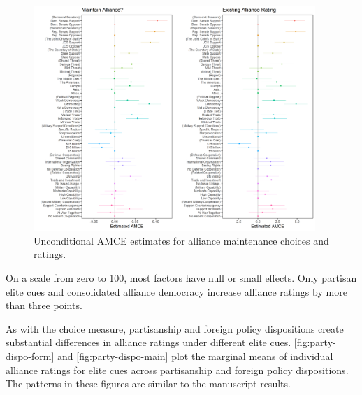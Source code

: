 \documentclass[12pt]{article}
\begin{document}
\begin{figure}[htpb]
	\centering
		\includegraphics[width=0.95\textwidth]{maintenance-plots.png}
	\caption{Unconditional AMCE estimates for alliance maintenance choices and ratings.}
	\label{fig:maintenance-plots}
\end{figure}

%

On a scale from zero to 100, most factors have null or small effects. 
Only partisan elite cues and consolidated alliance democracy increase alliance ratings by more than three points. 


As with the choice measure, partisanship and foreign policy dispositions create substantial differences in alliance ratings under different elite cues.
\autoref{fig:party-dispo-form} and \autoref{fig:party-dispo-main} plot the marginal means of individual alliance ratings for elite cues across partisanship and foreign policy dispositions. 
The patterns in these figures are similar to the manuscript results.  
\end{document}
